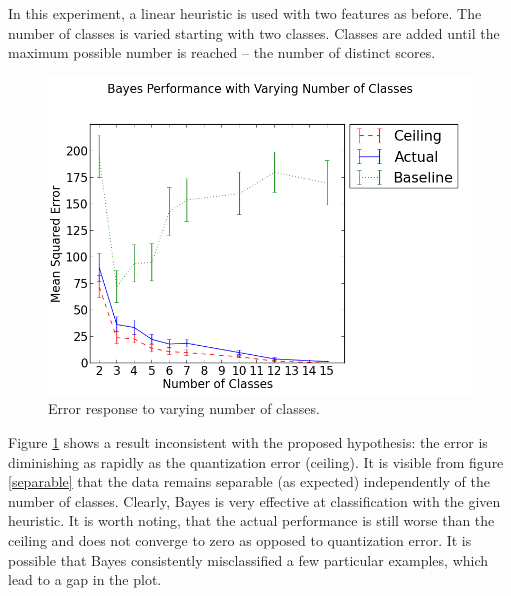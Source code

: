 \documentclass[12pt,notitlepage,twoside]{scrreprt}
\begin{document}
In this experiment, a linear heuristic is used with two features as before. The number of
classes is varied starting with two classes. Classes are added until the maximum possible
number is reached -- the number of distinct scores. 

\begin{figure}[h!]
  \includegraphics[width=\linewidth]{figs/quants.png}
  \caption{Error response to varying number of classes.\label{quants}}
\end{figure}
Figure \ref{quants} shows a result inconsistent with the proposed hypothesis: the error is
diminishing as rapidly as the quantization error (ceiling). It is visible from figure
\ref{separable} that the data remains separable (as expected) independently of the number
of classes. Clearly, Bayes is very effective at classification with the given heuristic.
It is worth noting, that the actual performance is still worse than the ceiling and does
not converge to zero as opposed to quantization error. It is possible that Bayes
consistently misclassified a few particular examples, which lead to a gap in the plot.
\end{document}
